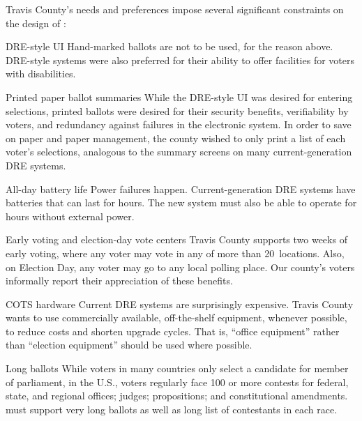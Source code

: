 Travis County's needs and preferences 
impose several significant constraints on the design of \projname:
\begin{compactdesc}
\item[DRE-style UI] 
    Hand-marked ballots are not to be used, for the reason above.
    DRE-style
    systems were also preferred for their ability to offer facilities for
    voters with disabilities.

\item[Printed paper ballot summaries]
    While the DRE-style UI was
    desired for entering selections, printed ballots were desired for their
    security benefits, verifiability by voters, and redundancy against failures in the
    electronic system. In order to save on paper and paper management, the county wished to
    only print a list of each voter's selections, analogous to the
    summary screens on many current-generation DRE systems.

\item[All-day battery life]
    Power failures happen. Current-generation DRE systems have
    batteries that can last for hours. The new system must also be
    able to operate for hours without external power.

\item[Early voting and election-day vote centers]
    Travis County supports two weeks of early voting, where any voter
    may vote in any of more than 20~locations. Also,
    on Election Day, any voter may go to any local polling
    place. Our county's voters informally report their appreciation of
    these benefits.

\item[COTS hardware]
    Current DRE systems are surprisingly expensive. Travis County wants
    to use commercially available, off-the-shelf equipment, whenever
    possible, to reduce costs and shorten upgrade cycles.
    That is, ``office equipment''  rather than ``election
    equipment'' should be used where possible.

\item[Long ballots]
    While voters in many countries only select a candidate for member
    of parliament, in the U.S., voters regularly face
    100 or more contests for federal, state, and regional
    offices; judges; propositions;
    and constitutional amendments. \projname must support very long
    ballots as well as long list of contestants in each race.
\end{compactdesc}

